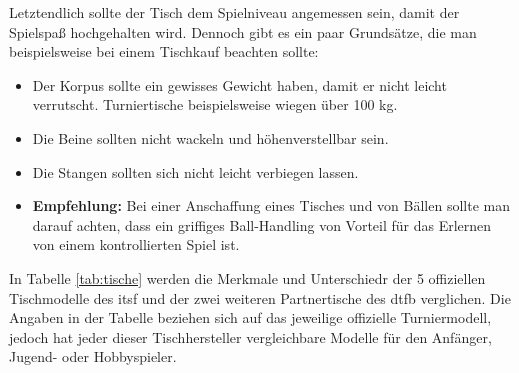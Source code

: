 Letztendlich sollte der Tisch dem Spielniveau angemessen sein, damit der Spielspaß hochgehalten wird. Dennoch gibt es ein paar Grundsätze, die man beispielsweise bei einem Tischkauf beachten sollte:
\begin{itemize}
\item Der Korpus sollte ein gewisses Gewicht haben, damit er nicht leicht verrutscht. Turniertische beispielsweise wiegen über 100 kg.
\item Die Beine sollten nicht wackeln und höhenverstellbar sein.
\item Die Stangen sollten sich nicht leicht verbiegen lassen.
\item {\bf Empfehlung:} Bei einer Anschaffung eines Tisches und von Bällen sollte man darauf achten, dass ein griffiges Ball-Handling von Vorteil für das Erlernen von einem kontrollierten Spiel ist.
\end{itemize}

In Tabelle \ref{tab:tische} werden die Merkmale und Unterschiedr der 5 offiziellen Tischmodelle des \gls{itsf} und der zwei weiteren Partnertische des \gls{dtfb} verglichen. 
Die Angaben in der Tabelle beziehen sich auf das jeweilige offizielle Turniermodell, jedoch hat jeder dieser Tischhersteller vergleichbare Modelle für den Anfänger, Jugend- oder Hobbyspieler.    


